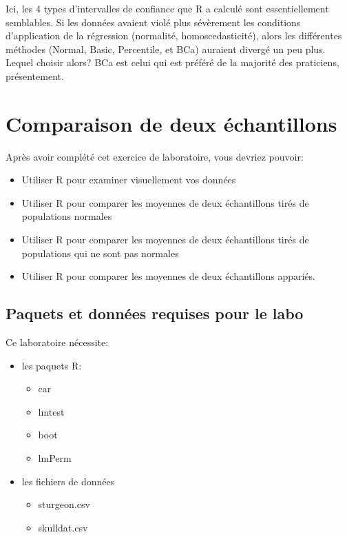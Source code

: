 \documentclass[12pt,]{book}
\providecommand{\tightlist}{%
  \setlength{\itemsep}{0pt}\setlength{\parskip}{0pt}}
\begin{document}
Ici, les 4 types d'intervalles de confiance que R a calculé sont essentiellement semblables. Si les données avaient violé plus sévèrement les conditions d'application de la régression (normalité, homoscedasticité), alors les différentes méthodes (Normal, Basic, Percentile, et BCa) auraient divergé un peu plus. Lequel choisir alors? BCa est celui qui est préféré de la majorité des praticiens, présentement.

\hypertarget{comparaison-de-deux-uxe9chantillons}{%
\chapter{Comparaison de deux échantillons}\label{comparaison-de-deux-uxe9chantillons}}

Après avoir complété cet exercice de laboratoire, vous devriez pouvoir:

\begin{itemize}
\tightlist
\item
  Utiliser R pour examiner visuellement vos données
\item
  Utiliser R pour comparer les moyennes de deux échantillons tirés de populations normales
\item
  Utiliser R pour comparer les moyennes de deux échantillons tirés de populations qui ne sont pas normales
\item
  Utiliser R pour comparer les moyennes de deux échantillons appariés.
\end{itemize}

\hypertarget{set-t}{%
\section{Paquets et données requises pour le labo}\label{set-t}}

Ce laboratoire nécessite:

\begin{itemize}
\tightlist
\item
  les paquets R:

  \begin{itemize}
  \tightlist
  \item
    car
  \item
    lmtest
  \item
    boot
  \item
    lmPerm
  \end{itemize}
\item
  les fichiers de données

  \begin{itemize}
  \tightlist
  \item
    sturgeon.csv
  \item
    skulldat.csv
  \end{itemize}
\end{itemize}
\end{document}
